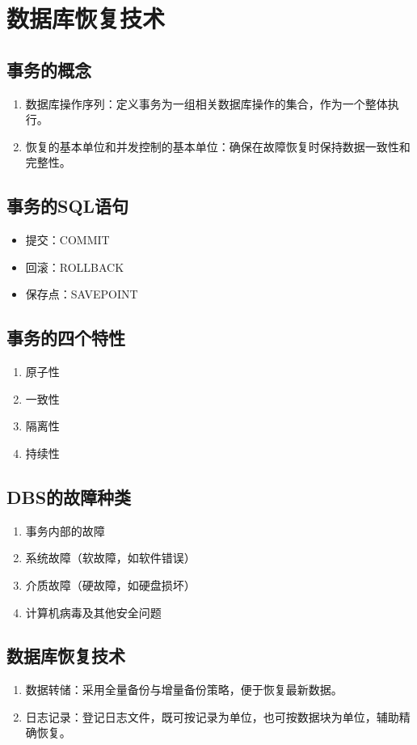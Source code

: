 \section{数据库恢复技术}
\subsection{事务的概念}
\begin{enumerate}
    \item 数据库操作序列：定义事务为一组相关数据库操作的集合，作为一个整体执行。
    \item 恢复的基本单位和并发控制的基本单位：确保在故障恢复时保持数据一致性和完整性。
\end{enumerate}

\subsection{事务的SQL语句}
\begin{itemize}
    \item 提交：COMMIT
    \item 回滚：ROLLBACK
    \item 保存点：SAVEPOINT
\end{itemize}

\subsection{事务的四个特性}
\begin{enumerate}
    \item 原子性
    \item 一致性
    \item 隔离性
    \item 持续性
\end{enumerate}

\subsection{DBS的故障种类}
\begin{enumerate}
    \item 事务内部的故障
    \item 系统故障（软故障，如软件错误）
    \item 介质故障（硬故障，如硬盘损坏）
    \item 计算机病毒及其他安全问题
\end{enumerate}

\subsection{数据库恢复技术}
\begin{enumerate}
    \item 数据转储：采用全量备份与增量备份策略，便于恢复最新数据。
    \item 日志记录：登记日志文件，既可按记录为单位，也可按数据块为单位，辅助精确恢复。
\end{enumerate}

